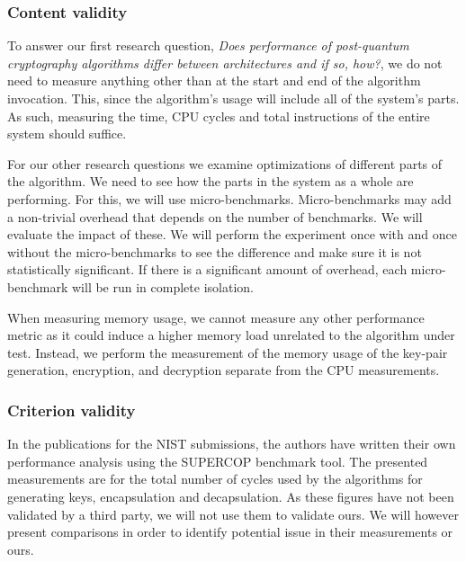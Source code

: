 \subsubsection{Content validity}


To answer our first research question, \textit{Does performance of post-quantum cryptography algorithms differ between architectures and if so, how?},  we do not need to measure anything other than at the start and end of the algorithm invocation. This, since the algorithm's usage will include all of the system's parts. As such, measuring the time, CPU cycles and total instructions of the entire system should suffice.

For our other research questions we examine optimizations of different parts of the algorithm. We need to see how the parts in the system as a whole are performing. For this, we will use micro-benchmarks. Micro-benchmarks may add a non-trivial overhead that depends on the number of benchmarks. We will evaluate the impact of these. We will perform the experiment once with and once without the micro-benchmarks to see the difference and make sure it is not statistically significant. If there is a significant amount of overhead, each micro-benchmark will be run in complete isolation.

When measuring memory usage, we cannot measure any other performance metric as it could induce a higher memory load unrelated to the algorithm under test. Instead, we perform the measurement of the memory usage of the key-pair generation, encryption, and decryption separate from the CPU measurements.

\subsubsection{Criterion validity}
In the publications for the NIST submissions, the authors have written their own performance analysis using the SUPERCOP benchmark tool. The presented measurements are for the total number of cycles used by the algorithms for generating keys, encapsulation and decapsulation. As these figures have not been validated by a third party, we will not use them to validate ours. We will however present comparisons in order to identify potential issue in their measurements or ours.

